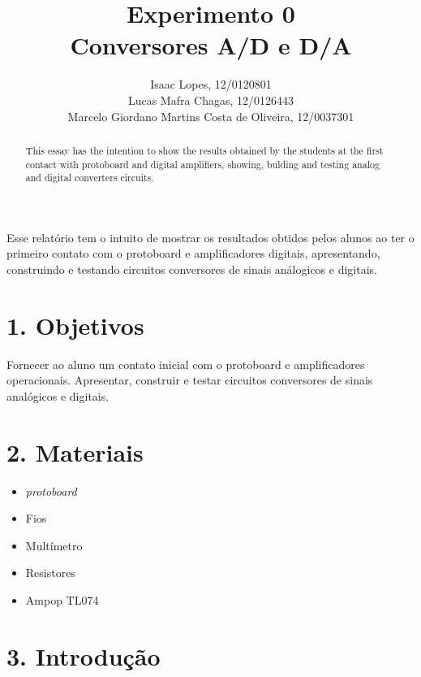 \documentclass[12pt]{article}
\title{Experimento 0\\ 
Conversores A/D e D/A }
\author{Isaac Lopes, 12/0120801\\
        Lucas Mafra Chagas, 12/0126443 \\
        Marcelo Giordano Martins Costa de Oliveira,  12/0037301
}
\begin{document}
 

\maketitle

 \begin{abstract}
   This essay has the intention to show the results obtained by the students at the first contact with protoboard and digital amplifiers, showing, bulding and testing analog and digital converters circuits.
 \end{abstract}
     
 \begin{resumo} 
  Esse relatório tem o intuito de mostrar os resultados obtidos pelos alunos ao ter o primeiro contato com o protoboard e amplificadores digitais, apresentando, construindo e testando circuitos conversores de sinais análogicos e digitais.
 \end{resumo}


\section{1. Objetivos}
\label{sec:Objetivos}

Fornecer ao aluno um contato inicial com o protoboard e amplificadores operacionais.
Apresentar, construir e testar circuitos conversores de sinais analógicos e digitais.

\section{2. Materiais} 
\label{sec:Materiais}

\begin{itemize}
    
    \item \textit{protoboard}
    
    \item Fios
    
    \item Multímetro
    
    \item Resistores
    
    \item Ampop TL074
    
\end{itemize}


\section{3. Introdução}
\label{sec:Introducao}
\end{document}
